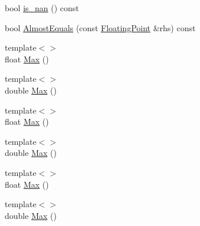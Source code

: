 \begin{DoxyCompactItemize}
\item 
bool \mbox{\hyperlink{classtesting_1_1internal_1_1_floating_point_a1fc654fd206efa98e480aa1e034f30d5}{is\+\_\+nan}} () const
\item 
bool \mbox{\hyperlink{classtesting_1_1internal_1_1_floating_point_a965214c1af2f9ac5adb1393794aa81e5}{Almost\+Equals}} (const \mbox{\hyperlink{classtesting_1_1internal_1_1_floating_point}{Floating\+Point}} \&rhs) const
\item 
{\footnotesize template$<$$>$ }\\float \mbox{\hyperlink{classtesting_1_1internal_1_1_floating_point_af2eda9331e679229a1baa3404b57b51d}{Max}} ()
\item 
{\footnotesize template$<$$>$ }\\double \mbox{\hyperlink{classtesting_1_1internal_1_1_floating_point_afc2e85c0e886cb13b2300e961c9a9648}{Max}} ()
\item 
{\footnotesize template$<$$>$ }\\float \mbox{\hyperlink{classtesting_1_1internal_1_1_floating_point_af2eda9331e679229a1baa3404b57b51d}{Max}} ()
\item 
{\footnotesize template$<$$>$ }\\double \mbox{\hyperlink{classtesting_1_1internal_1_1_floating_point_afc2e85c0e886cb13b2300e961c9a9648}{Max}} ()
\item 
{\footnotesize template$<$$>$ }\\float \mbox{\hyperlink{classtesting_1_1internal_1_1_floating_point_af2eda9331e679229a1baa3404b57b51d}{Max}} ()
\item 
{\footnotesize template$<$$>$ }\\double \mbox{\hyperlink{classtesting_1_1internal_1_1_floating_point_afc2e85c0e886cb13b2300e961c9a9648}{Max}} ()
\end{DoxyCompactItemize}
